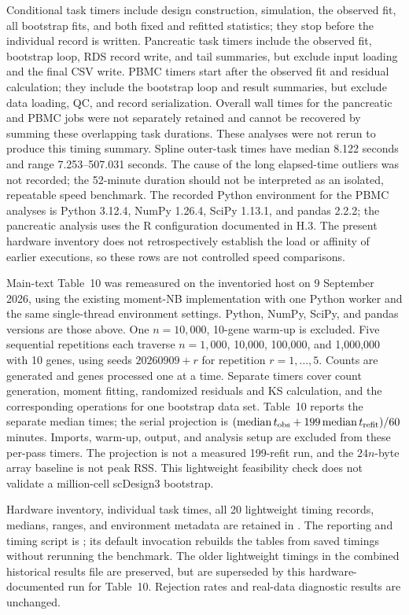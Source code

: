 \documentclass[12pt]{article}
\theoremstyle{remark}
\begin{document}
Conditional task timers include design construction, simulation, the
observed fit, all bootstrap fits, and both fixed and refitted statistics;
they stop before the individual record is written. Pancreatic task timers
include the observed fit, bootstrap loop, RDS record write, and tail
summaries, but exclude input loading and the final CSV write. PBMC timers
start after the observed fit and residual calculation; they include the
bootstrap loop and result summaries, but exclude data loading, QC, and
record serialization. Overall wall times for the pancreatic and PBMC
jobs were not separately retained and cannot be recovered by summing
these overlapping task durations. These analyses were not rerun to
produce this timing summary. Spline outer-task times have median 8.122
seconds and range 7.253--507.031 seconds. The cause of the long
elapsed-time outliers was not recorded; the 52-minute duration should
not be interpreted as an isolated, repeatable speed benchmark.
The recorded Python environment for the PBMC analyses is
Python 3.12.4, NumPy 1.26.4, SciPy 1.13.1, and pandas 2.2.2; the pancreatic
analysis uses the R configuration documented in H.3. The present hardware
inventory does not retrospectively establish the load or affinity of
earlier executions, so these rows are not controlled speed comparisons.

Main-text Table~10 was remeasured on the inventoried host on 9 September
2026, using the existing moment-NB implementation with one Python worker
and the same single-thread environment settings. Python, NumPy, SciPy,
and pandas versions are those above. One $n=10,000$, 10-gene warm-up is
excluded. Five sequential repetitions each traverse $n=1,000$, 10,000,
100,000, and 1,000,000 with 10 genes, using seeds $20260909+r$ for
repetition $r=1,\ldots,5$. Counts are generated and genes processed one
at a time. Separate timers cover count generation, moment fitting,
randomized residuals and KS calculation, and the corresponding operations
for one bootstrap data set. Table~10 reports the separate median times;
the serial projection is
$(\operatorname{median}t_{\rm obs}+199\operatorname{median}t_{\rm refit})/60$
minutes. Imports, warm-up, output, and analysis setup are excluded from
these per-pass timers. The projection is not a measured 199-refit run,
and the $24n$-byte array baseline is not peak RSS. This lightweight
feasibility check does not validate a million-cell scDesign3 bootstrap.

Hardware inventory, individual task times, all 20 lightweight timing
records, medians, ranges, and environment metadata are retained in
. The reporting and timing script
is ; its default invocation
rebuilds the tables from saved timings without rerunning the benchmark.
The older lightweight timings in the combined historical results file
are preserved, but are superseded by this hardware-documented run for
Table~10. Rejection rates and real-data diagnostic results are unchanged.

\fontsize{9}{11}\selectfont


\end{document}
